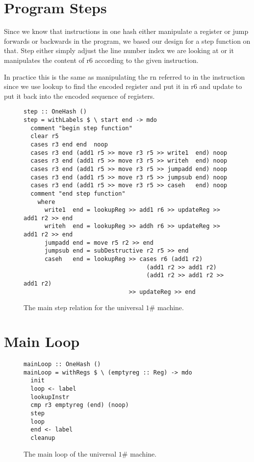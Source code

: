 \documentclass[10pt, preprint, nocopyrightspace]{sigplanconf}
\newcommand{\oh}{$1\#$\xspace}
\begin{document}
\section{Program Steps}

Since we know that instructions in one hash either manipulate a register or jump forwards or backwards in the program, we based our design for a step function on that. Step either simply adjust the line number index we are looking at or it manipulates the content of r6 according to the given instruction. 

In practice this is the same as manipulating the rn referred to in the instruction since we use lookup to find the encoded register and put it in r6 and update to put it back into the encoded sequence of registers. 


\begin{figure*}
\begin{lstlisting}
step :: OneHash ()
step = withLabels $ \ start end -> mdo
  comment "begin step function"
  clear r5
  cases r3 end end  noop
  cases r3 end (add1 r5 >> move r3 r5 >> write1  end) noop
  cases r3 end (add1 r5 >> move r3 r5 >> writeh  end) noop
  cases r3 end (add1 r5 >> move r3 r5 >> jumpadd end) noop
  cases r3 end (add1 r5 >> move r3 r5 >> jumpsub end) noop
  cases r3 end (add1 r5 >> move r3 r5 >> caseh   end) noop
  comment "end step function"
    where
      write1  end = lookupReg >> add1 r6 >> updateReg >> add1 r2 >> end
      writeh  end = lookupReg >> addh r6 >> updateReg >> add1 r2 >> end
      jumpadd end = move r5 r2 >> end
      jumpsub end = subDestructive r2 r5 >> end
      caseh   end = lookupReg >> cases r6 (add1 r2)
                                   (add1 r2 >> add1 r2)
                                   (add1 r2 >> add1 r2 >> add1 r2)
                              >> updateReg >> end
\end{lstlisting}
\caption{The main step relation for the universal \oh machine.}
\end{figure*}

\section{Main Loop}

\begin{figure}
\begin{lstlisting}
mainLoop :: OneHash ()
mainLoop = withRegs $ \ (emptyreg :: Reg) -> mdo
  init
  loop <- label
  lookupInstr
  cmp r3 emptyreg (end) (noop)
  step
  loop
  end <- label
  cleanup
\end{lstlisting}
\caption{The main loop of the universal \oh machine.}
\end{figure}
\end{document}
